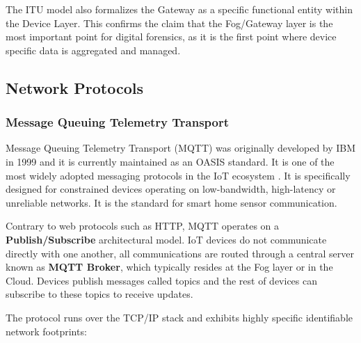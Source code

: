 The ITU model also formalizes the Gateway as a specific functional entity within the Device Layer. This confirms the claim that the Fog/Gateway layer is the most important point for digital forensics, as it is the first point where device specific data is aggregated and managed. 

\subsection{Network Protocols}

\subsubsection{Message Queuing Telemetry Transport}
 
 Message Queuing Telemetry Transport (MQTT) was originally developed by IBM in 1999 and it is currently maintained as an OASIS standard. It is one of the most widely adopted messaging protocols in the IoT ecosystem \cite{RFC9431}. It is specifically designed for constrained devices operating on low-bandwidth, high-latency or unreliable networks. It is the standard for smart home sensor communication. 

Contrary to web protocols such as HTTP, MQTT operates on a \textbf{Publish/Subscribe} architectural model. IoT devices do not communicate directly with one another, all communications are routed through a central server known as \textbf{MQTT Broker}, which typically resides at the Fog layer or in the Cloud. Devices publish messages called topics and the rest of devices can subscribe to these topics to receive updates. 

The protocol runs over the TCP/IP stack and exhibits highly specific identifiable network footprints:

